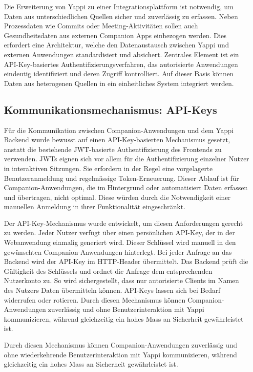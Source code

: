 \documentclass[12pt,a4paper]{report}
\begin{document}
Die Erweiterung von Yappi zu einer Integrationsplattform ist notwendig, um Daten aus unterschiedlichen Quellen sicher und 
zuverlässig zu erfassen. Neben Prozessdaten wie Commits oder Meeting-Aktivitäten sollen auch Gesundheitsdaten aus externen
Companion Apps einbezogen werden. Dies erfordert eine Architektur, welche den Datenaustausch zwischen Yappi und externen Anwendungen
standardisiert und absichert. Zentrales Element ist ein API-Key-basiertes Authentifizierungsverfahren, das autorisierte Anwendungen
eindeutig identifiziert und deren Zugriff kontrolliert. Auf dieser Basis können Daten aus heterogenen Quellen in ein einheitliches
System integriert werden.

\subsection{Kommunikationsmechanismus: API-Keys}

Für die Kommunikation zwischen Companion-Anwendungen und dem Yappi Backend wurde bewusst auf einen API-Key-basierten Mechanismus
gesetzt, anstatt die bestehende JWT-basierte Authentifizierung des Frontends zu verwenden. JWTs eignen sich vor allem für die
Authentifizierung einzelner Nutzer in interaktiven Sitzungen. Sie erfordern in der Regel eine vorgelagerte Benutzeranmeldung und
regelmässige Token-Erneuerung. Dieser Ablauf ist für Companion-Anwendungen, die im Hintergrund oder automatisiert Daten erfassen
und übertragen, nicht optimal. Diese würden durch die Notwendigkeit einer manuellen Anmeldung in ihrer Funktionalität eingeschränkt.

Der API-Key-Mechanismus wurde entwickelt, um diesen Anforderungen gerecht zu werden. Jeder Nutzer verfügt über einen persönlichen
API-Key, der in der Webanwendung einmalig generiert wird. Dieser Schlüssel wird manuell in den gewünschten Companion-Anwendungen
hinterlegt. Bei jeder Anfrage an das Backend wird der API-Key im HTTP-Header übermittelt. Das Backend prüft die Gültigkeit des 
Schlüssels und ordnet die Anfrage dem entsprechenden Nutzerkonto zu. So wird sichergestellt, dass nur autorisierte Clients im
Namen des Nutzers Daten übermitteln können. API-Keys lassen sich bei Bedarf widerrufen oder rotieren. Durch diesen Mechanismus
können Companion-Anwendungen zuverlässig und ohne Benutzerinteraktion mit Yappi kommunizieren, während gleichzeitig ein hohes Mass
an Sicherheit gewährleistet ist.

Durch diesen Mechanismus können Companion-Anwendungen zuverlässig und ohne wiederkehrende Benutzerinteraktion mit Yappi 
kommunizieren, während gleichzeitig ein hohes Mass an Sicherheit gewährleistet ist.
\end{document}
